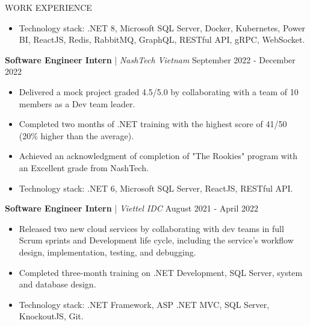\begin{rSection}{WORK EXPERIENCE}
\begin{itemize}
            \item Technology stack: .NET 8, Microsoft SQL Server, Docker, Kubernetes, Power BI, ReactJS, Redis, RabbitMQ, GraphQL, RESTful API, gRPC, WebSocket.
      \end{itemize}

      \vspace{1em}

      \quad\textbf{Software Engineer Intern} | \textit{NashTech Vietnam} \hfill September 2022 - December 2022\\
      \begin{itemize}
            \itemsep 0pt {} \vspace{-1em}
            \item Delivered a mock project graded 4.5/5.0 by collaborating with a team of 10 members as a Dev team leader.
            \item Completed two months of .NET training with the highest score of 41/50 (20\% higher than the average).
            \item Achieved an acknowledgment of completion of "The Rookies" program with an Excellent grade from NashTech.
            \item Technology stack: .NET 6, Microsoft SQL Server, ReactJS, RESTful API.
      \end{itemize}

      \vspace{1em}

      \quad\textbf{Software Engineer Intern} | \textit{Viettel IDC} \hfill August 2021 - April 2022\\
      \begin{itemize}
            \itemsep 0pt {} \vspace{-1em}
            \item Released two new cloud services by collaborating with dev teams in full Scrum sprints and Development life cycle,
                  including the service's workflow design, implementation, testing, and debugging.
            \item Completed three-month training on .NET Development, SQL Server, system and database design.
            \item Technology stack: .NET Framework, ASP .NET MVC, SQL Server, KnockoutJS, Git.

      \end{itemize}

\end{rSection}


